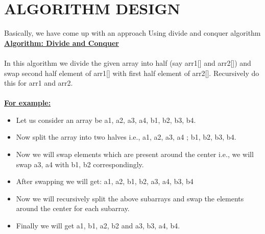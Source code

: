 \documentclass[conference]{IEEEtran}
\begin{document}

\section{\textbf{ ALGORITHM DESIGN }}
Basically, we have come up with an approach Using divide and conquer algorithm
\hfill \break
\textbf{\underline{Algorithm: Divide and Conquer}}\\\\
In this algorithm we divide the given array into half (say arr1[] and arr2[]) and swap second half element of arr1[] with first half element of arr2[]. Recursively do this for arr1 and arr2.\\\\
\textbf{\underline{For example:}}\\
\begin{itemize}
  \item Let us consider an array be a1, a2, a3, a4, b1, b2, b3, b4.
  \item Now split the array into two halves i.e., {a1, a2, a3, a4} ;{ b1, b2, b3, b4}.
\item Now we will swap elements which are present around the center i.e., we will swap a3, a4 with b1, b2 correspondingly.
\item After swapping we will  get: a1, a2, b1, b2, a3, a4, b3, b4
\item Now we will recursively split the above subarrays and swap the elements around the center for each subarray.
\item Finally we will get a1, b1, a2, b2 and a3, b3, a4, b4.
\end{itemize}\hfill \break

\end{document}
